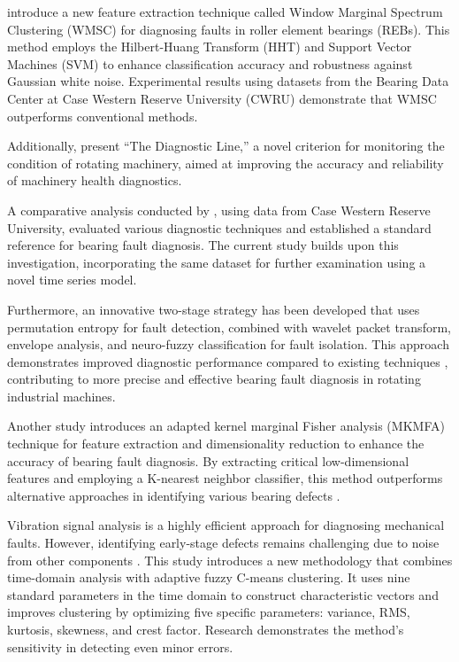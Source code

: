 \documentclass[sn-basic,pdflatex]{sn-jnl}
\theoremstyle{remark}
\theoremstyle{definition}
\begin{document}
\citet{WOS:000365686400021} introduce a new feature extraction technique
called Window Marginal Spectrum Clustering (WMSC) for diagnosing faults
in roller element bearings (REBs). This method employs the Hilbert-Huang
Transform (HHT) and Support Vector Machines (SVM) to enhance
classification accuracy and robustness against Gaussian white noise.
Experimental results using datasets from the Bearing Data Center at Case
Western Reserve University (CWRU) demonstrate that WMSC outperforms
conventional methods.

Additionally, \citet{WOS:000366534900022} present ``The Diagnostic
Line,'' a novel criterion for monitoring the condition of rotating
machinery, aimed at improving the accuracy and reliability of machinery
health diagnostics.

A comparative analysis conducted by \citet{WOS:000357230900007}, using
data from Case Western Reserve University, evaluated various diagnostic
techniques and established a standard reference for bearing fault
diagnosis. The current study builds upon this investigation,
incorporating the same dataset for further examination using a novel
time series model.

Furthermore, an innovative two-stage strategy has been developed that
uses permutation entropy for fault detection, combined with wavelet
packet transform, envelope analysis, and neuro-fuzzy classification for
fault isolation. This approach demonstrates improved diagnostic
performance compared to existing techniques
\citep{WOS:000385104500001, Rajabi2022}, contributing to more precise
and effective bearing fault diagnosis in rotating industrial machines.

Another study introduces an adapted kernel marginal Fisher analysis
(MKMFA) technique for feature extraction and dimensionality reduction to
enhance the accuracy of bearing fault diagnosis. By extracting critical
low-dimensional features and employing a K-nearest neighbor classifier,
this method outperforms alternative approaches in identifying various
bearing defects \citep{WOS:000392016300001}.

Vibration signal analysis is a highly efficient approach for diagnosing
mechanical faults. However, identifying early-stage defects remains
challenging due to noise from other components
\citep{WOS:000369301600001, WOS:000367992900001}. This study introduces
a new methodology that combines time-domain analysis with adaptive fuzzy
C-means clustering. It uses nine standard parameters in the time domain
to construct characteristic vectors and improves clustering by
optimizing five specific parameters: variance, RMS, kurtosis, skewness,
and crest factor. Research demonstrates the method's sensitivity in
detecting even minor errors.
\end{document}
